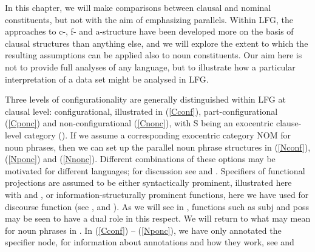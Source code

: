 \documentclass[output=paper,hidelinks]{langscibook}
\begin{document}
In this chapter, we will make comparisons between clausal and nominal constituents, but not with the aim of emphasizing parallels. Within LFG, the approaches to c-, f- and a-structure have been developed more on the basis of clausal structures than anything else, and we will explore the extent to which the resulting assumptions can be applied also to noun constituents. Our aim here is not to provide full analyses of any language, but to illustrate how a particular interpretation of a data set might be analysed in LFG.



 Three levels of configurationality are generally distinguished within LFG at clausal level: configurational, illustrated in (\ref{Cconf}), part-configurational (\ref{Cponc}) and non-configurational (\ref{Cnonc}), with S being an exocentric clause-level category (). If we assume a corresponding exocentric category NOM for noun phrases, then we can set up the parallel noun phrase structures in (\ref{Nconf}), (\ref{Nponc}) and (\ref{Nnonc}). Different combinations of these options may be motivated for different languages; for discussion see \citet{nordlinger1998constructive} and \citet[118--9]{BresnanEtAl2016}. Specifiers of functional projections are assumed to be either syntactically prominent, illustrated here with {\SUBJ} and {\POSS}, or information-structurally prominent functions, here we have used {\DF} for discourse function (see \citealt{Snijders2015}, \citealt[104--11]{BresnanEtAl2016} and \citealt[121--6]{DLM:LFG}). As we will see in , functions such as {\sc subj} and {\sc poss} may be seen to have a dual role in this respect.  We will return to what {\DF} may mean for noun phrases in . In (\ref{Cconf}) -- (\ref{Nponc}), we have only annotated the specifier node, for information about annotations and how they work,
 see
 and


\begin{minipage}[t]{0.5\textwidth}
\end{minipage}%
\begin{minipage}[t]{0.5\textwidth}
\end{minipage}
\end{document}
